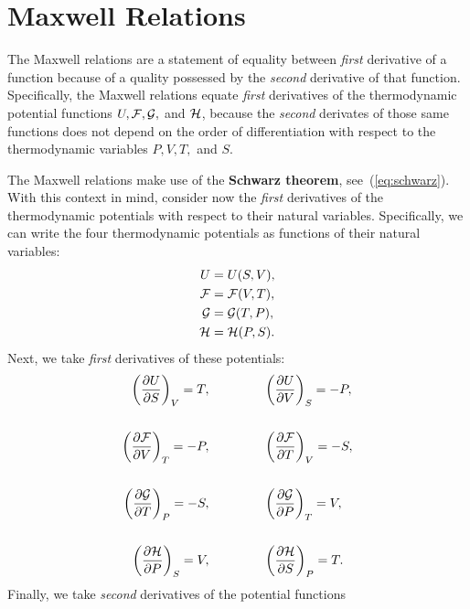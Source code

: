 \section{Maxwell Relations}
The Maxwell relations are a statement of equality between
{\em first} derivative of a function because of a quality possessed by 
the {\em second} derivative of that function.  Specifically, 
the Maxwell relations equate {\em first} derivatives of the thermodynamic
potential functions $U, \mathcal{F}, \mathcal{G},$ and $\mathcal{H}$, 
because the {\em second} derivates of those
same functions does not depend on the order of differentiation
with respect to the thermodynamic variables $P, V, T,$ and $S$.

The Maxwell relations make use of the {\bf Schwarz theorem},
see~(\ref{eq:schwarz}).
With this context in mind, consider now the {\em first} derivatives 
of the thermodynamic potentials with respect to their natural variables.
Specifically, we can write the four thermodynamic potentials as functions
of their natural variables:
\begin{align}
 U &= U(S, V), \\
 \mathcal{F} &= \mathcal{F}(V, T), \\
 \mathcal{G} &= \mathcal{G}(T, P), \\
 \mathcal{H} &= \mathcal{H}(P, S). 
\end{align}
Next, we take {\em first} derivatives of these potentials:
\begin{align}
\left( \frac{\partial U}{\partial S} \right)_V = T, & \hspace{1.5cm}
\left( \frac{\partial U}{\partial V} \right)_S = -P, \\ 
& \nonumber \\ 
%
\left( \frac{\partial \helmholtz}{\partial V} \right)_T = -P, & \hspace{1.5cm}
\left( \frac{\partial \helmholtz}{\partial T} \right)_V = -S, \\
& \nonumber \\
%
\left( \frac{\partial \gibbs}{\partial T} \right)_P = -S, & \hspace{1.5cm}
\left( \frac{\partial \gibbs}{\partial P} \right)_T = V, \\ 
& \nonumber \\ 
%
\left( \frac{\partial \enthalpy}{\partial P} \right)_S = V, & \hspace{1.5cm}
\left( \frac{\partial \enthalpy}{\partial S} \right)_P = T. 
\end{align}
Finally, we take {\em second} derivatives of the potential functions
